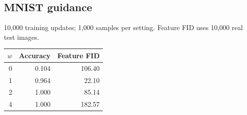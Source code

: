 \subsection{MNIST guidance}

10,000 training updates; 1,000 samples per setting. Feature FID uses 10,000 real test images.

\begin{center}
\begin{tabular}{rrr}
\hline
$w$ & Accuracy & Feature FID \\
\hline
0 & 0.104 & 106.40 \\
1 & 0.964 & 22.10 \\
2 & 1.000 & 85.14 \\
4 & 1.000 & 182.57 \\
\hline
\end{tabular}
\end{center}
